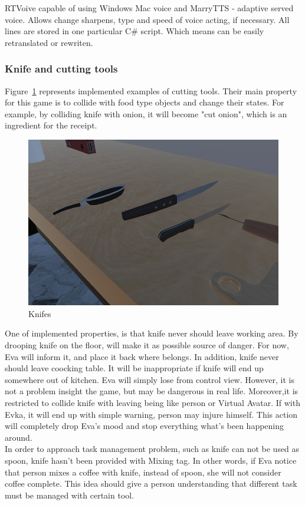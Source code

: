 \documentclass[18pt]{article}
\numberwithin{equation}{section} %
\numberwithin{figure}{section} %
\numberwithin{table}{section} %
\begin{document}
	
	RTVoive capable of using Windows Mac voice and MarryTTS - adaptive served voice. Allows change sharpens, type and speed of voice acting, if necessary. All lines are stored in one particular C\# script. Which means can be easily retranslated or rewriten. 	
	
	\subsubsection{Knife and cutting tools}
	Figure~\ref{fig:knife_spoon} represents implemented examples of cutting tools. Their main property for this game is to collide with food type objects and change their states. For example, by colliding knife with onion, it will become "cut onion", which is an ingredient for the receipt. \\
		\begin{figure}[H]
			\centering
			\includegraphics[width=0.5\linewidth]{images/knife_spoon}
			\caption{Knifes}
			\label{fig:knife_spoon}
		\end{figure}
	One of implemented properties, is that knife never should leave working area. By drooping knife on the floor, will make it as possible source of danger. For now, Eva will inform it, and place it back where belongs. In addition, knife never should leave coocking table. It will be inappropriate if knife will end up somewhere out of kitchen. Eva will simply lose from control view. However, it is not a problem insight the game, but may be dangerous in real life. Moreover,it is restricted to collide knife with leaving being like person or Virtual Avatar. If with Evka, it will end up with simple warning, person may injure himself. This action will completely drop Eva's mood and stop everything what's been happening around. \\
	In order to approach task management problem, such as knife can not be used as spoon, knife hasn't been provided with Mixing tag. In other words, if Eva notice that person mixes a coffee with knife, instead of spoon, she will not consider coffee complete. This idea should give a person understanding that different task must be managed with certain tool. \\
\end{document}
